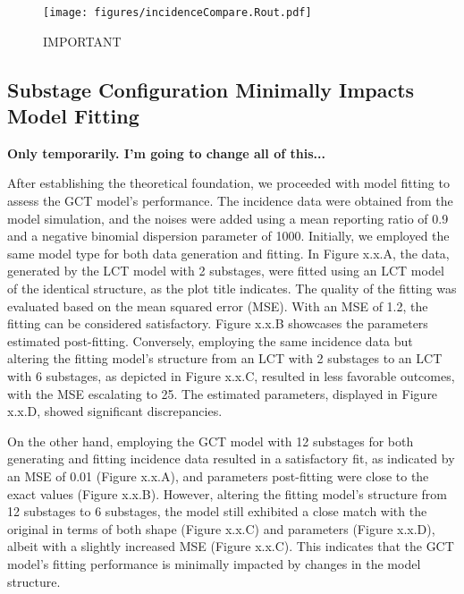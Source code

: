 \documentclass[12pt]{article}
\begin{document}
\begin{figure}[h]
    \centering
    \texttt{[image: figures/incidenceCompare.Rout.pdf]}
    \caption{IMPORTANT}
\end{figure}


\subsection{Substage Configuration Minimally Impacts Model Fitting}
\textbf{Only temporarily. I'm going to change all of this...}

After establishing the theoretical foundation, we proceeded with model fitting to assess the GCT model's performance. The incidence data were obtained from the model simulation, and the noises were added using a mean reporting ratio of 0.9 and a negative binomial dispersion parameter of 1000. Initially, we employed the same model type for both data generation and fitting. In Figure x.x.A, the data, generated by the LCT model with 2 substages, were fitted using an LCT model of the identical structure, as the plot title indicates. The quality of the fitting was evaluated based on the mean squared error (MSE). With an MSE of 1.2, the fitting can be considered satisfactory. Figure x.x.B showcases the parameters estimated post-fitting. Conversely, employing the same incidence data but altering the fitting model's structure from an LCT with 2 substages to an LCT with 6 substages, as depicted in Figure x.x.C, resulted in less favorable outcomes, with the MSE escalating to 25. The estimated parameters, displayed in Figure x.x.D, showed significant discrepancies. 


On the other hand, employing the GCT model with 12 substages for both generating and fitting incidence data resulted in a satisfactory fit, as indicated by an MSE of 0.01 (Figure x.x.A), and parameters post-fitting were close to the exact values (Figure x.x.B). However, altering the fitting model's structure from 12 substages to 6 substages, the model still exhibited a close match with the original in terms of both shape (Figure x.x.C) and parameters (Figure x.x.D), albeit with a slightly increased MSE (Figure x.x.C). This indicates that the GCT model's fitting performance is minimally impacted by changes in the model structure.
\end{document}
